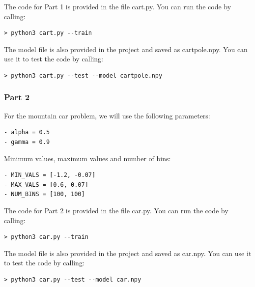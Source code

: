 \documentclass[twoside,10pt]{article}
\begin{document}
The code for Part 1 is provided in the file cart.py. You can run the
code by calling:

\begin{verbatim}
> python3 cart.py --train
\end{verbatim}

The model file is also provided in the project and saved as cartpole.npy.
You can use it to test the code by calling:

\begin{verbatim}
> python3 cart.py --test --model cartpole.npy
\end{verbatim}


\subsubsection*{Part 2}\label{part-2}

For the mountain car problem, we will use the following parameters:

\begin{verbatim}
- alpha = 0.5
- gamma = 0.9
\end{verbatim}

Minimum values, maximum values and number of bins:

\begin{verbatim}
- MIN_VALS = [-1.2, -0.07]
- MAX_VALS = [0.6, 0.07]
- NUM_BINS = [100, 100]
\end{verbatim}

The code for Part 2 is provided in the file car.py. You can run the code
by calling:

\begin{verbatim}
> python3 car.py --train
\end{verbatim}

The model file is also provided in the project and saved as car.npy. You
can use it to test the code by calling:

\begin{verbatim}
> python3 car.py --test --model car.npy
\end{verbatim}
\end{document}
